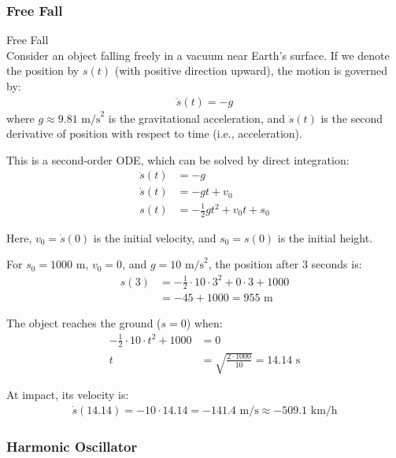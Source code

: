 \subsubsection{Free Fall}

\begin{example2}{Free Fall}\\
Consider an object falling freely in a vacuum near Earth's surface. If we denote the position by $s(t)$ (with positive direction upward), the motion is governed by:
\begin{align*}
\ddot{s}(t) = -g
\end{align*}
where $g \approx 9.81 \text{ m/s}^2$ is the gravitational acceleration, and $\ddot{s}(t)$ is the second derivative of position with respect to time (i.e., acceleration).

This is a second-order ODE, which can be solved by direct integration:
\begin{align*}
\ddot{s}(t) &= -g\\
\dot{s}(t) &= -gt + v_0\\
s(t) &= -\frac{1}{2}gt^2 + v_0t + s_0
\end{align*}

Here, $v_0 = \dot{s}(0)$ is the initial velocity, and $s_0 = s(0)$ is the initial height.

For $s_0 = 1000 \text{ m}$, $v_0 = 0$, and $g = 10 \text{ m/s}^2$, the position after 3 seconds is:
\begin{align*}
s(3) &= -\frac{1}{2} \cdot 10 \cdot 3^2 + 0 \cdot 3 + 1000\\
&= -45 + 1000 = 955 \text{ m}
\end{align*}

The object reaches the ground ($s = 0$) when:
\begin{align*}
-\frac{1}{2} \cdot 10 \cdot t^2 + 1000 &= 0\\
t &= \sqrt{\frac{2 \cdot 1000}{10}} = 14.14 \text{ s}
\end{align*}

At impact, its velocity is:
\begin{align*}
\dot{s}(14.14) = -10 \cdot 14.14 = -141.4 \text{ m/s} \approx -509.1 \text{ km/h}
\end{align*}
\end{example2}

\subsubsection{Harmonic Oscillator}

